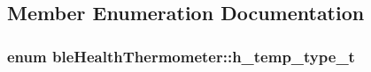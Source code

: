 \subsection{Member Enumeration Documentation}
\hypertarget{classble_health_thermometer_ac18502532d0b3bfeeeb10f7929695a3f}{
\subsubsection[{h\-\_\-temp\-\_\-type\-\_\-t}]{\setlength{\rightskip}{0pt plus 5cm}enum {\bf ble\-Health\-Thermometer\-::h\-\_\-temp\-\_\-type\-\_\-t}}}\label{classble_health_thermometer_ac18502532d0b3bfeeeb10f7929695a3f}
